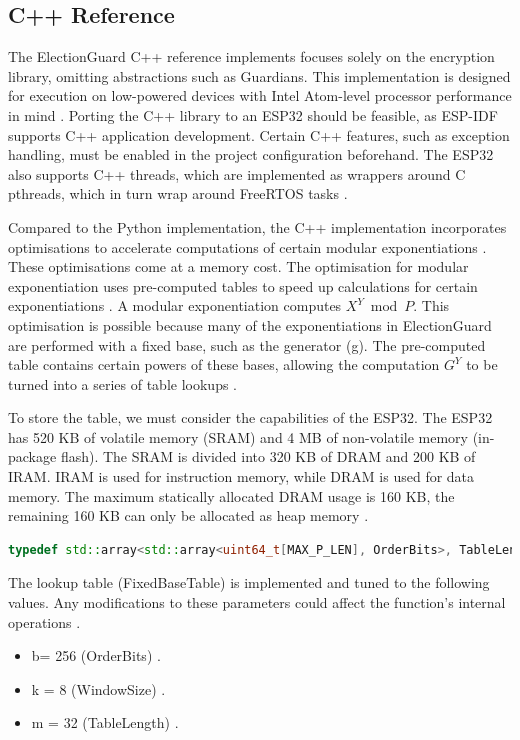 \subsection{C++ Reference}
The ElectionGuard C++ reference implements focuses solely on the encryption library, omitting abstractions such as Guardians. This implementation is designed for execution on low-powered devices with Intel Atom-level processor performance in mind \cite{cpp-reference} \cite{eg-docs}. Porting the C++ library to an ESP32 should be feasible, as ESP-IDF supports C++ application development. Certain C++ features, such as exception handling, must be enabled in the project configuration beforehand. The ESP32 also supports C++ threads, which are implemented as wrappers around C pthreads, which in turn wrap around FreeRTOS tasks \cite{esp-prog}. 

Compared to the Python implementation, the C++ implementation incorporates optimisations to accelerate computations of certain modular exponentiations \cite{cpp-reference}. These optimisations come at a memory cost. The optimisation for modular exponentiation uses pre-computed tables to speed up calculations for certain exponentiations \cite{cpp-reference}. A modular exponentiation computes \(X^Y \bmod P\). This optimisation is possible because many of the exponentiations in ElectionGuard are performed with a fixed base, such as the generator (g). The pre-computed table contains certain powers of these bases, allowing the computation \(G^Y\) to be turned into a series of table lookups \cite[22-23]{eg-paper}.

To store the table, we must consider the capabilities of the ESP32. The ESP32 has 520 KB of volatile memory (SRAM) and 4 MB of non-volatile memory (in-package flash). The SRAM is divided into 320 KB of DRAM and 200 KB of IRAM. IRAM is used for instruction memory, while DRAM is used for data memory. The maximum statically allocated DRAM usage is 160 KB, the remaining 160 KB can only be allocated as heap memory \cite{esp32-ref}. 

\begin{lstlisting}[language=C++, caption={FixedBaseTable Definition from \cite{cpp-reference}}]
    typedef std::array<std::array<uint64_t[MAX_P_LEN], OrderBits>, TableLength> FixedBaseTable;
\end{lstlisting}

The lookup table (FixedBaseTable) is implemented and tuned to the following values. Any modifications to these parameters could affect the function's internal operations \cite{cpp-reference}.
\begin{itemize}
    \item b= 256 (OrderBits) \cite{cpp-reference}.
    \item k = 8 (WindowSize) \cite{cpp-reference}.
    \item m = 32 (TableLength) \cite{cpp-reference}.
\end{itemize}

